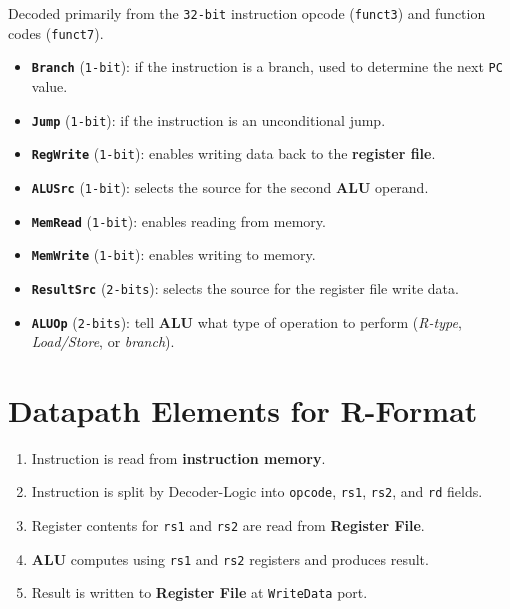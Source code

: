 \documentclass[12pt, letterpaper]{article}
\begin{document}
Decoded primarily from the \texttt{32-bit} instruction opcode
(\texttt{funct3}) and function codes (\texttt{funct7}).

\begin{itemize}
  \item \textbf{\texttt{Branch}} (\texttt{1-bit}): if the instruction
    is a branch, used to determine the next \texttt{PC} value.
  \item \textbf{\texttt{Jump}} (\texttt{1-bit}): if the instruction
    is an unconditional jump.
  \item \textbf{\texttt{RegWrite}} (\texttt{1-bit}): enables writing
    data back to the \textbf{register file}.
  \item \textbf{\texttt{ALUSrc}} (\texttt{1-bit}): selects the source
    for the second \textbf{ALU} operand.
  \item \textbf{\texttt{MemRead}} (\texttt{1-bit}): enables
    reading from memory.
  \item \textbf{\texttt{MemWrite}} (\texttt{1-bit}): enables
    writing to memory.
  \item \textbf{\texttt{ResultSrc}} (\texttt{2-bits}): selects the
    source for the register file write data.
  \item \textbf{\texttt{ALUOp}} (\texttt{2-bits}): tell \textbf{ALU}
    what type of operation to perform (\textit{R-type},
    \textit{Load/Store}, or \textit{branch}).
\end{itemize}

\section*{Datapath Elements for R-Format}

\begin{enumerate}
  \item Instruction is read from \textbf{instruction memory}.
  \item Instruction is split by Decoder-Logic into \texttt{opcode},
    \texttt{rs1}, \texttt{rs2}, and \texttt{rd} fields.
  \item Register contents for \texttt{rs1} and \texttt{rs2} are read
    from \textbf{Register File}.
  \item \textbf{ALU} computes using \texttt{rs1} and \texttt{rs2}
    registers and produces result.
  \item Result is written to \textbf{Register File} at
    \texttt{WriteData} port.
\end{enumerate}
\end{document}
